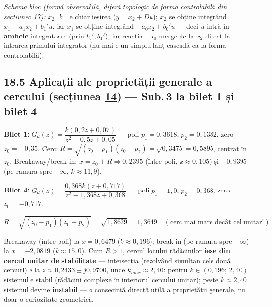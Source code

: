 \documentclass[10pt,a4paper]{article}
\begin{document}
\textit{Schema bloc (formă observabilă, diferă topologic de forma controlabilă din secțiunea \hyperref[sec:17]{17}):} $x_2[k]$ e chiar ieșirea ($y{=}x_2{+}Du$); $x_2$ se obține integrând $x_1{-}a_1x_2{+}b_1'u$, iar $x_1$ se obține integrând $-a_0x_2{+}b_0'u$ — deci $u$ intră în \textbf{ambele} integratoare (prin $b_0',b_1'$), iar reacția $-a_0$ merge de la $x_2$ direct la intrarea primului integrator (nu mai e un simplu lanț cascadă ca la forma controlabilă).

\subsection*{18.5 Aplicații ale proprietății generale a cercului (secțiunea \hyperref[sec:14]{14}) — Sub.\,3 la bilet 1 și bilet 4}
\textbf{Bilet 1:} $G_d(z)=\dfrac{k(0{,}2z+0{,}07)}{z^2-0{,}5z+0{,}05}$ — poli $p_1{=}0{,}3618,\,p_2{=}0{,}1382$, zero $z_0{=}{-}0{,}35$. Cerc: $R=\sqrt{(z_0-p_1)(z_0-p_2)}=\sqrt{0{,}3475}=0{,}5895$, centrat în $z_0$. Breakaway/break-in: $x=z_0\pm R\Rightarrow 0{,}2395$ (între poli, $k{\approx}0{,}105$) și $-0{,}9395$ (pe ramura spre $-\infty$, $k{\approx}11{,}9$).

\textbf{Bilet 4:} $G_d(z)=\dfrac{0{,}368k(z+0{,}717)}{z^2-1{,}368z+0{,}368}$ — poli $p_1{=}1{,}0,\,p_2{=}0{,}368$, zero $z_0{=}{-}0{,}717$.
\begin{keyeq}\color{red!65!black}
$$R=\sqrt{(z_0-p_1)(z_0-p_2)}=\sqrt{1{,}8629}=1{,}3649\quad(\text{cerc mai mare decât cel unitar!})$$
\end{keyeq}
Breakaway (între poli) la $x{=}0{,}6479$ ($k{\approx}0{,}196$); break-in (pe ramura spre $-\infty$) la $x{=}{-}2{,}0819$ ($k{\approx}15{,}0$). Cum $R{>}1$, cercul locului rădăcinilor \textbf{iese din cercul unitar de stabilitate} — intersecția (rezolvând simultan cele două cercuri) e la $z{\approx}0{,}2433\pm j0{,}9700$, unde $k_{max}\approx2{,}40$: pentru $k\in(0{,}196;\,2{,}40)$ sistemul e stabil (rădăcini complexe în interiorul cercului unitar); peste $k{\approx}2{,}40$ sistemul devine \textbf{instabil} — o consecință directă utilă a proprietății generale, nu doar o curiozitate geometrică.

\begin{center}
\end{center}
\end{document}

